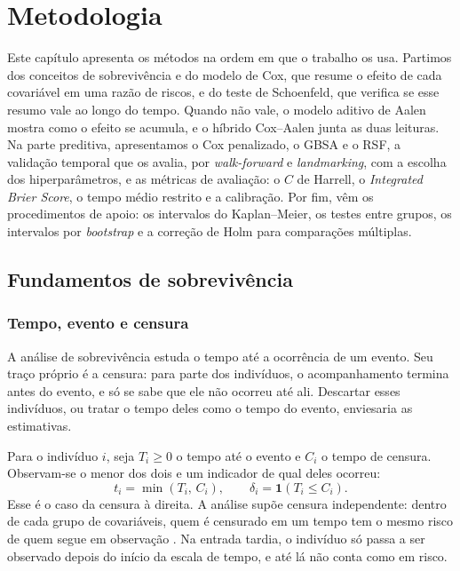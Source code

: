 
\chapter{Metodologia}
\label{cap:metodologia}
\raggedbottom

Este capítulo apresenta os métodos na ordem em que o trabalho os usa. Partimos dos conceitos de sobrevivência e do modelo de Cox, que resume o efeito de cada covariável em uma razão de riscos, e do teste de Schoenfeld, que verifica se esse resumo vale ao longo do tempo. Quando não vale, o modelo aditivo de Aalen mostra como o efeito se acumula, e o híbrido Cox--Aalen junta as duas leituras. Na parte preditiva, apresentamos o Cox penalizado, o GBSA e o RSF, a validação temporal que os avalia, por \textit{walk-forward} e \textit{landmarking}, com a escolha dos hiperparâmetros, e as métricas de avaliação: o $C$ de Harrell, o \textit{Integrated Brier Score}, o tempo médio restrito e a calibração. Por fim, vêm os procedimentos de apoio: os intervalos do Kaplan--Meier, os testes entre grupos, os intervalos por \textit{bootstrap} e a correção de Holm para comparações múltiplas.

\section{Fundamentos de sobrevivência}
\label{sec:sobrevivencia}

    \subsection{Tempo, evento e censura}
    \label{subsec:conceitos_sobrevivencia}

A análise de sobrevivência estuda o tempo até a ocorrência de um evento. Seu traço próprio é a censura: para parte dos indivíduos, o acompanhamento termina antes do evento, e só se sabe que ele não ocorreu até ali. Descartar esses indivíduos, ou tratar o tempo deles como o tempo do evento, enviesaria as estimativas.

Para o indivíduo $i$, seja $T_i \geq 0$ o tempo até o evento e $C_i$ o tempo de censura. Observam-se o menor dos dois e um indicador de qual deles ocorreu:
\begin{equation}
    t_i = \min(T_i,\, C_i),
    \qquad
    \delta_i = \mathbf{1}(T_i \leq C_i).
    \label{eq:censura}
\end{equation}
Esse é o caso da censura à direita. A análise supõe censura independente: dentro de cada grupo de covariáveis, quem é censurado em um tempo tem o mesmo risco de quem segue em observação \citep{kleinbaum2012}. Na entrada tardia, o indivíduo só passa a ser observado depois do início da escala de tempo, e até lá não conta como em risco.

